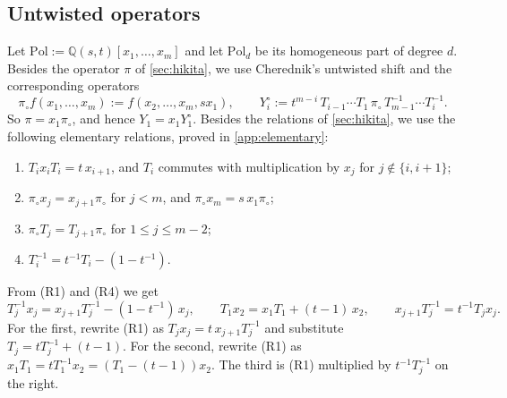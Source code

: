 \documentclass[11pt]{amsart}
\theoremstyle{definition}
\theoremstyle{remark}
\numberwithin{equation}{section}
\begin{document}
\subsection{Untwisted operators}
Let $\mathrm{Pol}:=\mathbb{Q}(s,t)[x_1,\dots,x_m]$ and let $\mathrm{Pol}_d$ be its homogeneous part of degree $d$. Besides the operator $\pi$ of \cref{sec:hikita}, we use Cherednik's untwisted shift and the corresponding operators
\[ \pi_\circ f(x_1,\dots,x_m):=f(x_2,\dots,x_m,sx_1),\qquad Y^\circ_i:=t^{m-i}\,T_{i-1}\cdots T_1\,\pi_\circ\,T_{m-1}^{-1}\cdots T_i^{-1}. \]
So $\pi=x_1\pi_\circ$, and hence $Y_1=x_1Y^\circ_1$. Besides the relations of \cref{sec:hikita}, we use the following elementary relations, proved in \cref{app:elementary}:
\begin{enumerate}
\item[(R1)] $T_ix_iT_i=t\,x_{i+1}$, and $T_i$ commutes with multiplication by $x_j$ for $j\notin\{i,i+1\}$;
\item[(R2)] $\pi_\circ x_j=x_{j+1}\pi_\circ$ for $j<m$, and $\pi_\circ x_m=s\,x_1\pi_\circ$;
\item[(R3)] $\pi_\circ T_j=T_{j+1}\pi_\circ$ for $1\le j\le m-2$;
\item[(R4)] $T_i^{-1}=t^{-1}T_i-(1-t^{-1})$.
\end{enumerate}
From (R1) and (R4) we get
\begin{equation}\label{eq:TX}
T_j^{-1}x_j=x_{j+1}T_j^{-1}-(1-t^{-1})\,x_j,\qquad T_1x_2=x_1T_1+(t-1)\,x_2,\qquad x_{j+1}T_j^{-1}=t^{-1}T_jx_j .
\end{equation}
For the first, rewrite (R1) as $T_jx_j=t\,x_{j+1}T_j^{-1}$ and substitute $T_j=tT_j^{-1}+(t-1)$. For the second, rewrite (R1) as $x_1T_1=tT_1^{-1}x_2=(T_1-(t-1))x_2$. The third is (R1) multiplied by $t^{-1}T_j^{-1}$ on the right.
\end{document}
